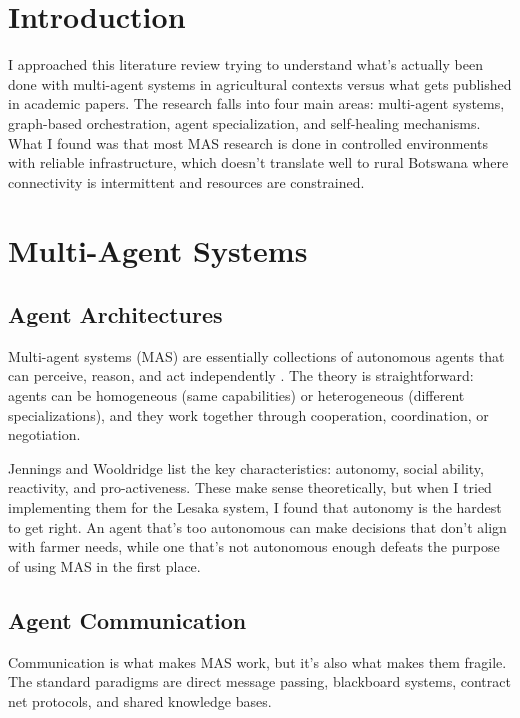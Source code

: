 
\section{Introduction}

I approached this literature review trying to understand what's actually been done with multi-agent systems in agricultural contexts versus what gets published in academic papers. The research falls into four main areas: multi-agent systems, graph-based orchestration, agent specialization, and self-healing mechanisms. What I found was that most MAS research is done in controlled environments with reliable infrastructure, which doesn't translate well to rural Botswana where connectivity is intermittent and resources are constrained.

\section{Multi-Agent Systems}

\subsection{Agent Architectures}

Multi-agent systems (MAS) are essentially collections of autonomous agents that can perceive, reason, and act independently \cite{wooldridge2009introduction}. The theory is straightforward: agents can be homogeneous (same capabilities) or heterogeneous (different specializations), and they work together through cooperation, coordination, or negotiation.

Jennings and Wooldridge \cite{jennings1998agent} list the key characteristics: autonomy, social ability, reactivity, and pro-activeness. These make sense theoretically, but when I tried implementing them for the Lesaka system, I found that autonomy is the hardest to get right. An agent that's too autonomous can make decisions that don't align with farmer needs, while one that's not autonomous enough defeats the purpose of using MAS in the first place.

\subsection{Agent Communication}

Communication is what makes MAS work, but it's also what makes them fragile. The standard paradigms are direct message passing, blackboard systems, contract net protocols, and shared knowledge bases.


